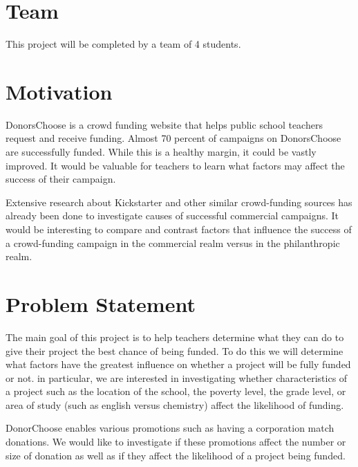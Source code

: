 \documentclass{article}
\begin{document}
 


\section{Team}
This project will be completed by a team of 4 students.

\section{Motivation}
DonorsChoose is a crowd funding website that helps public school teachers request and receive funding. Almost 70 percent of campaigns on DonorsChoose are successfully funded. While this is a healthy margin, it could be vastly improved. It would be valuable for teachers to learn what factors may affect the success of their campaign.  

Extensive research about Kickstarter and other similar crowd-funding sources has already been done to investigate causes of successful commercial campaigns. It would be interesting to compare and contrast factors that influence the success of a crowd-funding campaign in the commercial realm versus in the philanthropic realm.

\section{Problem Statement}
The main goal of this project is to help teachers determine what they can do to give their project the best chance of being funded. To do this we will determine what factors have the greatest influence on whether a project will be fully funded or not.  in particular, we are interested in investigating whether characteristics of a project such as the location of the school, the poverty level, the grade level, or area of study (such as english versus chemistry) affect the likelihood of funding.  

DonorChoose enables various promotions such as having a corporation match donations.  We would like to investigate if these promotions affect the number or size of donation as well as if they affect the likelihood of a project being funded.
\end{document}
